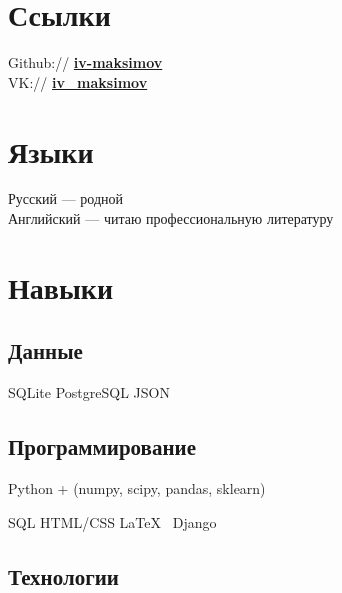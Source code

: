 \documentclass[a4paper]{resume}
\begin{document}
\begin{minipage}[t]{0.33\textwidth}
\sectionspace



\section{Ссылки} 

Github:// \href{https://github.com/iv-maksimov}{\bf iv-maksimov} \\
VK:// \href{http://vk.com/iv\_maksimov}{\bf iv\_maksimov}

\sectionspace 


\section{Языки}
Русский — родной \\
Английский — читаю профессиональную литературу



\sectionspace 


\section{Навыки}

\subsection{Данные}
SQLite \textbullet{} PostgreSQL \textbullet {}JSON
\sectionspace

\subsection{Программирование}

Python + (numpy, scipy, pandas, sklearn)

SQL \textbullet{} HTML/CSS \textbullet{} \LaTeX\ \textbullet{} Django

\sectionspace

\subsection{Технологии}


\end{minipage}
\end{document}
